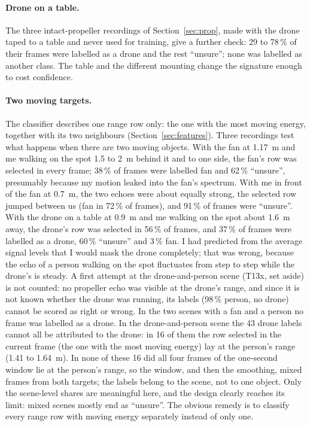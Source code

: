 \documentclass[11pt,a4paper]{article}
\begin{document}
\paragraph{Drone on a table.} The three intact-propeller recordings of Section~\ref{sec:prop}, made with the drone taped to a table and never used for training, give a further check: 29 to 78\,\% of their frames were labelled as a drone and the rest ``unsure''; none was labelled as another class. The table and the different mounting change the signature enough to cost confidence.

\paragraph{Two moving targets.} The classifier describes one range row only: the one with the most moving energy, together with its two neighbours (Section~\ref{sec:features}). Three recordings test what happens when there are two moving objects. With the fan at \SI{1.17}{m} and me walking on the spot 1.5 to \SI{2}{m} behind it and to one side, the fan's row was selected in every frame; 38\,\% of frames were labelled fan and 62\,\% ``unsure'', presumably because my motion leaked into the fan's spectrum. With me in front of the fan at \SI{0.7}{m}, the two echoes were about equally strong, the selected row jumped between us (fan in 72\,\% of frames), and 91\,\% of frames were ``unsure''. With the drone on a table at \SI{0.9}{m} and me walking on the spot about \SI{1.6}{m} away, the drone's row was selected in 56\,\% of frames, and 37\,\% of frames were labelled as a drone, 60\,\% ``unsure'' and 3\,\% fan. I had predicted from the average signal levels that I would mask the drone completely; that was wrong, because the echo of a person walking on the spot fluctuates from step to step while the drone's is steady. A first attempt at the drone-and-person scene (T13x, set aside) is not counted: no propeller echo was visible at the drone's range, and since it is not known whether the drone was running, its labels (98\,\% person, no drone) cannot be scored as right or wrong. In the two scenes with a fan and a person no frame was labelled as a drone. In the drone-and-person scene the 43 drone labels cannot all be attributed to the drone: in 16 of them the row selected in the current frame (the one with the most moving energy) lay at the person's range (1.41 to \SI{1.64}{m}). In none of these 16 did all four frames of the one-second window lie at the person's range, so the window, and then the smoothing, mixed frames from both targets; the labels belong to the scene, not to one object. Only the scene-level shares are meaningful here, and the design clearly reaches its limit: mixed scenes mostly end as ``unsure''. The obvious remedy is to classify every range row with moving energy separately instead of only one.
\end{document}
